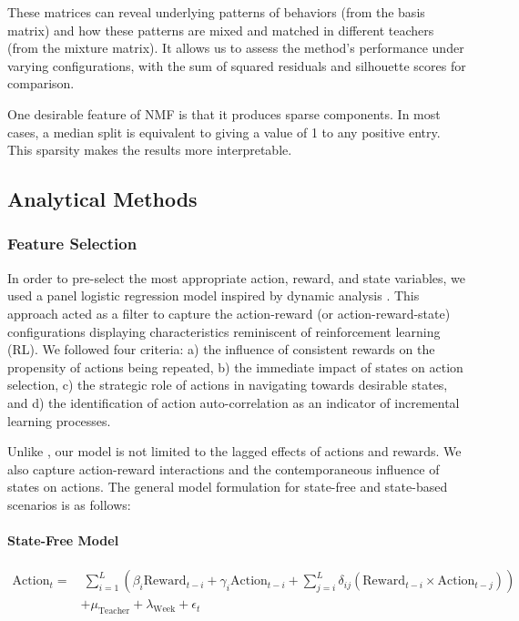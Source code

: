 \documentclass[
  number,
  preprint,
  3p,
  onecolumn]{elsarticle}
\let\oldparagraph\paragraph
\renewcommand{\paragraph}[1]{\oldparagraph{#1}\mbox{}}
\begin{document}
These matrices can reveal underlying patterns of behaviors (from the
basis matrix) and how these patterns are mixed and matched in different
teachers (from the mixture matrix). It allows us to assess the method's
performance under varying configurations, with the sum of squared
residuals and silhouette scores for comparison.

One desirable feature of NMF is that it produces sparse components. In
most cases, a median split is equivalent to giving a value of 1 to any
positive entry. This sparsity makes the results more interpretable.

\subsection{Analytical Methods}\label{analytical-methods}

\subsubsection{Feature Selection}\label{feature-selection}

In order to pre-select the most appropriate action, reward, and state
variables, we used a panel logistic regression model inspired by dynamic
analysis \citep{lau2005}. This approach acted as a filter to capture the
action-reward (or action-reward-state) configurations displaying
characteristics reminiscent of reinforcement learning (RL). We followed
four criteria: a) the influence of consistent rewards on the propensity
of actions being repeated, b) the immediate impact of states on action
selection, c) the strategic role of actions in navigating towards
desirable states, and d) the identification of action auto-correlation
as an indicator of incremental learning processes.

Unlike \citep{lau2005}, our model is not limited to the lagged effects
of actions and rewards. We also capture action-reward interactions and
the contemporaneous influence of states on actions. The general model
formulation for state-free and state-based scenarios is as follows:

\paragraph{State-Free Model}\label{state-free-model}

\begin{align*}
\text{Action}_t =& \ \sum_{i=1}^{L} \left( \beta_{i} \text{Reward}_{t-i} + \gamma_i \text{Action}_{t-i} + \sum_{j=i}^{L} \delta_{ij} (\text{Reward}_{t-i} \times \text{Action}_{t-j}) \right) \\
& + \mu_{\text{Teacher}} + \lambda_{\text{Week}} + \epsilon_t 
\end{align*}
\end{document}
